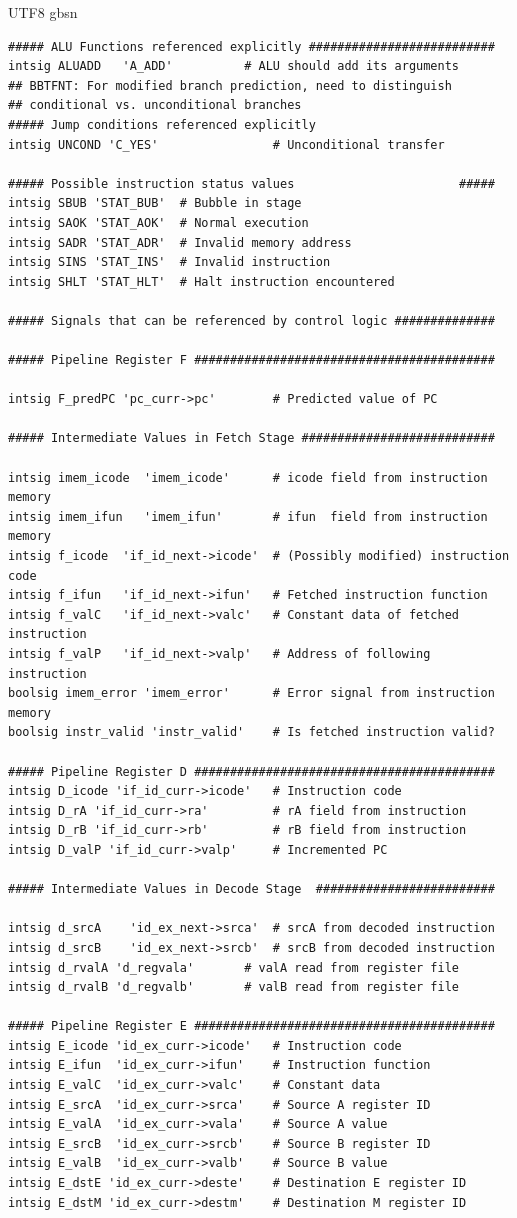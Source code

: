 \documentclass {article}
\begin{document}
\begin {CJK*} {UTF8} {gbsn}
\begin{lstlisting}
##### ALU Functions referenced explicitly ##########################
intsig ALUADD	'A_ADD'		     # ALU should add its arguments
## BBTFNT: For modified branch prediction, need to distinguish
## conditional vs. unconditional branches
##### Jump conditions referenced explicitly
intsig UNCOND 'C_YES'       	     # Unconditional transfer

##### Possible instruction status values                       #####
intsig SBUB	'STAT_BUB'	# Bubble in stage
intsig SAOK	'STAT_AOK'	# Normal execution
intsig SADR	'STAT_ADR'	# Invalid memory address
intsig SINS	'STAT_INS'	# Invalid instruction
intsig SHLT	'STAT_HLT'	# Halt instruction encountered

##### Signals that can be referenced by control logic ##############

##### Pipeline Register F ##########################################

intsig F_predPC 'pc_curr->pc'	     # Predicted value of PC

##### Intermediate Values in Fetch Stage ###########################

intsig imem_icode  'imem_icode'      # icode field from instruction memory
intsig imem_ifun   'imem_ifun'       # ifun  field from instruction memory
intsig f_icode	'if_id_next->icode'  # (Possibly modified) instruction code
intsig f_ifun	'if_id_next->ifun'   # Fetched instruction function
intsig f_valC	'if_id_next->valc'   # Constant data of fetched instruction
intsig f_valP	'if_id_next->valp'   # Address of following instruction
boolsig imem_error 'imem_error'	     # Error signal from instruction memory
boolsig instr_valid 'instr_valid'    # Is fetched instruction valid?

##### Pipeline Register D ##########################################
intsig D_icode 'if_id_curr->icode'   # Instruction code
intsig D_rA 'if_id_curr->ra'	     # rA field from instruction
intsig D_rB 'if_id_curr->rb'	     # rB field from instruction
intsig D_valP 'if_id_curr->valp'     # Incremented PC

##### Intermediate Values in Decode Stage  #########################

intsig d_srcA	 'id_ex_next->srca'  # srcA from decoded instruction
intsig d_srcB	 'id_ex_next->srcb'  # srcB from decoded instruction
intsig d_rvalA 'd_regvala'	     # valA read from register file
intsig d_rvalB 'd_regvalb'	     # valB read from register file

##### Pipeline Register E ##########################################
intsig E_icode 'id_ex_curr->icode'   # Instruction code
intsig E_ifun  'id_ex_curr->ifun'    # Instruction function
intsig E_valC  'id_ex_curr->valc'    # Constant data
intsig E_srcA  'id_ex_curr->srca'    # Source A register ID
intsig E_valA  'id_ex_curr->vala'    # Source A value
intsig E_srcB  'id_ex_curr->srcb'    # Source B register ID
intsig E_valB  'id_ex_curr->valb'    # Source B value
intsig E_dstE 'id_ex_curr->deste'    # Destination E register ID
intsig E_dstM 'id_ex_curr->destm'    # Destination M register ID


\end{lstlisting}
\end{CJK*}
\end{document}
